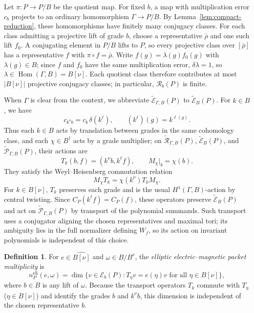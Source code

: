 \documentclass[11pt,a4paper,reqno]{amsart}
\theoremstyle{plain}
\theoremstyle{definition}
\newtheorem{definition}[theorem]{Definition}
\theoremstyle{remark}
\numberwithin{equation}{section}
\DeclareMathOperator{\Hom}{Hom}
\newcommand{\cE}{\mathcal E}
\newcommand{\cR}{\mathcal R}
\newcommand{\wtE}{\widetilde{\mathcal E}}
\newcommand{\wtP}{\widetilde{\mathcal P}}
\newcommand{\wtR}{\widetilde{\mathcal R}}
\begin{document}
Let $\pi\colon P\to P/B$ be the quotient map. For fixed $b$, a map with multiplication error $c_b$ projects to an ordinary homomorphism $\Gamma\to P/B$. By Lemma~\ref{lem:compact-reduction}, these homomorphisms have finitely many conjugacy classes. For each class admitting a projective lift of grade $b$, choose a representative $\bar\rho$ and one such lift $f_0$. A conjugating element in $P/B$ lifts to $P$, so every projective class over $[\bar\rho]$ has a representative $f$ with $\pi\circ f=\bar\rho$. Write $f(g)=\lambda(g)f_0(g)$ with $\lambda(g)\in B$; since $f$ and $f_0$ have the same multiplication error, $\delta\lambda=1$, so $\lambda\in\Hom(\Gamma,B)=B[\nu]$. Each quotient class therefore contributes at most $|B[\nu]|$ projective conjugacy classes; in particular, $\cR_b(P)$ is finite.

When $\Gamma$ is clear from the context, we abbreviate $\wtE_{\Gamma,B}(P)$ to $\wtE_B(P)$. For $k\in B$, we have
\[
c_{k^\nu b}=c_b\,\delta(k^\ell),\qquad
(k^\ell)(g)=k^{\ell(g)}.
\]
Thus each $k\in B$ acts by translation between grades in the same cohomology class, and each $\chi\in B^\dagger$ acts by a grade multiplier; on $\wtR_{\Gamma,B}(P)$, $\wtE_B(P)$, and $\wtP_{\Gamma,B}(P)$, their actions are
\begin{equation}\label{eq:heisenberg-ops}
T_k(b,f)=(k^\nu b,k^\ell f),\qquad M_\chi|_b=\chi(b).
\end{equation}
They satisfy the Weyl--Heisenberg commutation relation
\[
M_\chi T_k=\chi(k^\nu)T_kM_\chi.
\]
For $k\in B[\nu]$, $T_k$ preserves each grade and is the usual $H^1(\Gamma,B)$-action by central twisting. Since $C_P(k^\ell f)=C_P(f)$, these operators preserve $\wtE_B(P)$ and act on $\wtP_{\Gamma,B}(P)$ by transport of the polynomial summands. Such transport uses a conjugator aligning the chosen representatives and maximal tori; its ambiguity lies in the full normalizer defining $W_f$, so its action on invariant polynomials is independent of this choice.

\begin{definition}\label{def:packets}
For $e\in\widehat{B[\nu]}$ and $\omega\in B/B^\nu$, the \emph{elliptic electric--magnetic packet multiplicity} is
\[
n_P^{\mathrm{ell}}(e,\omega)=\dim\{v\in\cE_b(P):T_\eta v=e(\eta)v\text{ for all }\eta\in B[\nu]\},
\]
where $b\in B$ is any lift of $\omega$. Because the transport operators $T_k$ commute with $T_\eta$ ($\eta\in B[\nu]$) and identify the grades $b$ and $k^\nu b$, this dimension is independent of the chosen representative $b$.
\end{definition}
\end{document}
